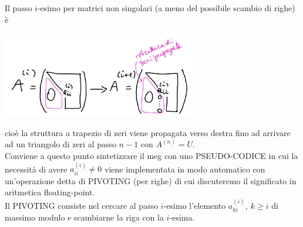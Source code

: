 \documentclass[12pt,a4paper]{article}
\begin{document}
Il passo $i$-esimo per matrici non singolari (a meno del possibile scambio di righe) è
\begin{center}
    \includegraphics[width = 0.65\textwidth]{lez21_pag20.jpg}
\end{center}
cioè la struttura a trapezio di zeri viene propagata verso destra fino ad arrivare ad un triangolo di zeri al passo $n-1$ con $A^{(n)} = U$.\\
Conviene a questo punto sintetizzare il meg con uno PSEUDO-CODICE in cui la necessità di avere $a_{ii}^{(i)} \neq 0$ viene implementata in modo automatico con un'operazione detta di PIVOTING (per righe) di cui discuteremo il significato in aritmetica floating-point.\\
Il PIVOTING consiste nel cercare al passo $i$-esimo l'elemento $a_{ki}^{(i)}, \ k \ge i$ di massimo modulo e scambiarne la riga con la $i$-esima.
\end{document}
